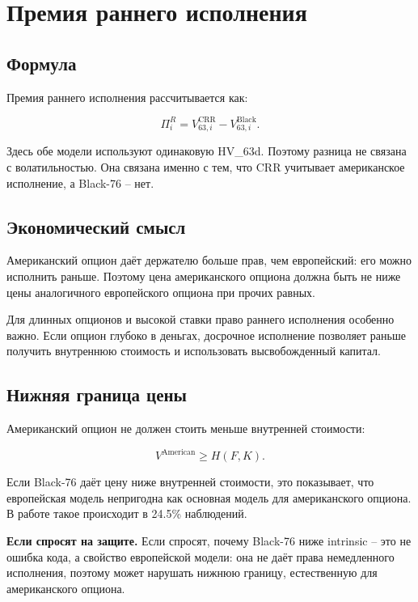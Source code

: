 \documentclass[11pt,a4paper]{article}
\newcommand{\answer}[1]{%
  \vspace{0.15em}
  \noindent\colorbox{softgreen}{%
    \parbox{\dimexpr\linewidth-2\fboxsep\relax}{\textbf{Если спросят на защите.} #1}%
  }\vspace{0.2em}
}
\begin{document}
\section{Премия раннего исполнения}

\subsection{Формула}

Премия раннего исполнения рассчитывается как:

\begin{equation}
\Pi^R_i =
V^{\text{CRR}}_{63,i}
-
V^{\text{Black}}_{63,i}.
\end{equation}

Здесь обе модели используют одинаковую HV\_63d. Поэтому разница не связана с волатильностью. Она связана именно с тем, что CRR учитывает американское исполнение, а Black-76 -- нет.

\subsection{Экономический смысл}

Американский опцион даёт держателю больше прав, чем европейский: его можно исполнить раньше. Поэтому цена американского опциона должна быть не ниже цены аналогичного европейского опциона при прочих равных.

Для длинных опционов и высокой ставки право раннего исполнения особенно важно. Если опцион глубоко в деньгах, досрочное исполнение позволяет раньше получить внутреннюю стоимость и использовать высвобожденный капитал.

\subsection{Нижняя граница цены}

Американский опцион не должен стоить меньше внутренней стоимости:

\begin{equation}
V^{\text{American}} \geq H(F,K).
\end{equation}

Если Black-76 даёт цену ниже внутренней стоимости, это показывает, что европейская модель непригодна как основная модель для американского опциона. В работе такое происходит в 24.5\% наблюдений.

\answer{Если спросят, почему Black-76 ниже intrinsic -- это не ошибка кода, а свойство европейской модели: она не даёт права немедленного исполнения, поэтому может нарушать нижнюю границу, естественную для американского опциона.}
\end{document}
